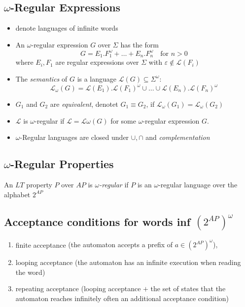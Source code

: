 \documentclass[a4paper, 10pt]{article}
\begin{document}
\subsection*{$\omega$-Regular Expressions}
\begin{shaded}
\begin{itemize}
    \item denote languages of infinite words
    \item An $\omega$-regular expression $G$ over $\Sigma$ has the form
    \[ G=E_1.F_1^\omega + \dots + E_n.F_n^\omega \quad \textrm{for } n>0 \]
    where $E_i,F_1$ are regular expressions over $\Sigma$ with $\varepsilon \not\in\mathcal{L}(F_i)$
    \item The \emph{semantics} of $G$ is a language $\mathcal{L}(G)\subseteq\Sigma^\omega$:
    \[\mathcal{L}_\omega(G)=\mathcal{L}(E_1).\mathcal{L}(F_1)^\omega \cup\dots\cup \mathcal{L}(E_n).\mathcal{L}(F_n)^\omega \]
    \item $G_1$ and $G_2$ are \emph{equivalent}, denotet $G_1\equiv G_2$, if $\mathcal{L}_\omega(G_1)=\mathcal{L}_\omega(G_2)$
    \item $\mathcal{L}$ is $\omega$-regular if $\mathcal{L}=\mathcal{L}\omega(G)$ for some $\omega$-regular expression $G$.
    \item $\omega$-Regular languages are closed under $\cup,\cap$ and \emph{complementation}
\end{itemize}
\end{shaded}

\subsection*{$\omega$-Regular Properties}
\begin{shaded}
        An $LT$ property $P$ over $AP$ is \emph{$\omega$-regular} if $P$ is an $\omega$-regular language over the alphabet $2^{AP}$
\end{shaded}

\subsection*{Acceptance conditions for words inf $(2^{AP})^\omega$}
\begin{enumerate}
    \item finite acceptance {\tiny (the automaton accepts a prefix of $a\in(2^{AP})^\omega$), }
    \item looping acceptance {\tiny (the automaton has an infinite execution when reading the word) }
    \item repeating acceptance {\tiny (looping acceptance $+$ the set of states that the automaton reaches infinitely often an additional acceptance condition) }
\end{enumerate}
\end{document}

